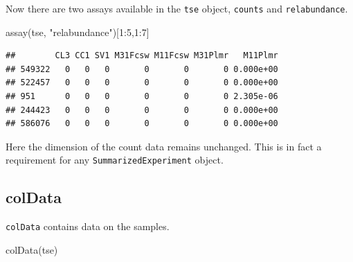 \documentclass[
]{book}
\newenvironment{Shaded}{\begin{snugshade}}{\end{snugshade}}
\newcommand{\DecValTok}[1]{\textcolor[rgb]{0.00,0.00,0.81}{#1}}
\newcommand{\FunctionTok}[1]{\textcolor[rgb]{0.00,0.00,0.00}{#1}}
\newcommand{\NormalTok}[1]{#1}
\newcommand{\SpecialCharTok}[1]{\textcolor[rgb]{0.00,0.00,0.00}{#1}}
\newcommand{\StringTok}[1]{\textcolor[rgb]{0.31,0.60,0.02}{#1}}
\begin{document}
Now there are two assays available in the \texttt{tse} object, \texttt{counts} and
\texttt{relabundance}.

\begin{Shaded}
\begin{Highlighting}[]
\FunctionTok{assay}\NormalTok{(tse, }\StringTok{"relabundance"}\NormalTok{)[}\DecValTok{1}\SpecialCharTok{:}\DecValTok{5}\NormalTok{,}\DecValTok{1}\SpecialCharTok{:}\DecValTok{7}\NormalTok{]}
\end{Highlighting}
\end{Shaded}

\begin{verbatim}
##        CL3 CC1 SV1 M31Fcsw M11Fcsw M31Plmr   M11Plmr
## 549322   0   0   0       0       0       0 0.000e+00
## 522457   0   0   0       0       0       0 0.000e+00
## 951      0   0   0       0       0       0 2.305e-06
## 244423   0   0   0       0       0       0 0.000e+00
## 586076   0   0   0       0       0       0 0.000e+00
\end{verbatim}

Here the dimension of the count data remains unchanged. This is in
fact a requirement for any \texttt{SummarizedExperiment} object.

\hypertarget{coldata}{%
\subsection{colData}\label{coldata}}

\texttt{colData} contains data on the samples.

\begin{Shaded}
\begin{Highlighting}[]
\FunctionTok{colData}\NormalTok{(tse)}
\end{Highlighting}
\end{Shaded}
\end{document}
